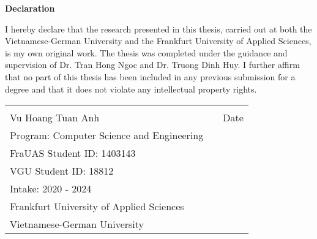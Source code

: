 \centerline{\LARGE \textbf{Declaration}}

\vspace{10mm}

I hereby declare that the research presented in this thesis, carried out at both the Vietnamese-German University and the Frankfurt University of Applied Sciences, is my own original work. The thesis was completed under the guidance and supervision of Dr. Tran Hong Ngoc and Dr. Truong Dinh Huy. I further affirm that no part of this thesis has been included in any previous submission for a degree and that it does not violate any intellectual property rights.

\vfill

\begin{tabular}{@{}p{3.5in}p{0.1in}p{1.5in}@{}}
  \hrulefill & & \hrulefill \\
  Vu Hoang Tuan Anh & & Date \\
  Program: Computer Science and Engineering & & \\ 
  FraUAS Student ID: 1403143 & & \\
  VGU Student ID: 18812 & & \\
  Intake: 2020 - 2024 & & \\
  Frankfurt University of Applied Sciences & & \\
  Vietnamese-German University & & \\
\end{tabular}